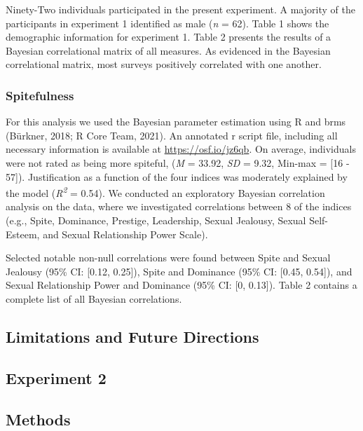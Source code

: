 \documentclass[
  donotrepeattitle,doc, 12pt, a4paper,floatsintext]{apa7}
\begin{document}
Ninety-Two individuals participated in the present experiment. A majority of the participants in experiment 1 identified as male (\emph{n} = 62). Table 1 shows the demographic information for experiment 1. Table 2 presents the results of a Bayesian correlational matrix of all measures. As evidenced in the Bayesian correlational matrix, most surveys positively correlated with one another.

\hypertarget{spitefulness}{%
\subsubsection{Spitefulness}\label{spitefulness}}

For this analysis we used the Bayesian parameter estimation using R and brms (Bürkner, 2018; R Core Team, 2021). An annotated r script file, including all necessary information is available at \url{https://osf.io/jz6qb}. On average, individuals were not rated as being more spiteful, (\emph{M} = 33.92, \emph{SD} = 9.32, Min-max = {[}16 - 57{]}). Justification as a function of the four indices was moderately explained by the model (\emph{R\textsuperscript{2}} = 0.54). We conducted an exploratory Bayesian correlation analysis on the data, where we investigated correlations between 8 of the indices (e.g., Spite, Dominance, Prestige, Leadership, Sexual Jealousy, Sexual Self-Esteem, and Sexual Relationship Power Scale).

Selected notable non-null correlations were found between Spite and Sexual Jealousy (95\% CI: {[}0.12, 0.25{]}), Spite and Dominance (95\% CI: {[}0.45, 0.54{]}), and Sexual Relationship Power and Dominance (95\% CI: {[}0, 0.13{]}). Table 2 contains a complete list of all Bayesian correlations.

\hypertarget{limitations-and-future-directions}{%
\subsection{Limitations and Future Directions}\label{limitations-and-future-directions}}

\hypertarget{experiment-2}{%
\subsection{Experiment 2}\label{experiment-2}}

\hypertarget{methods}{%
\subsection{Methods}\label{methods}}
\end{document}
